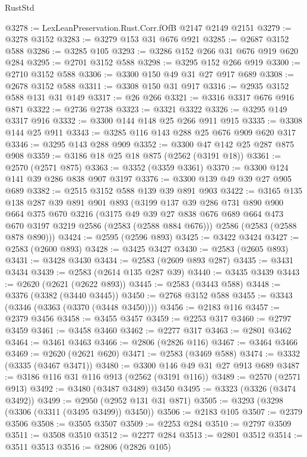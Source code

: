 \begin{lexlean}{RustStd}
\begin{coremodule}
{\begin{coremodule}
{{{{{{{{{{{{{{{@3278 := LexLeanPreservation.Rust.Corr.fOfB @2147 @2149 @2151
@3279 := @3278 @3152
@3283 := @3279 @153 @31 @676 @921
@3285 := @2687 @3152 @588
@3286 := @3285 @105
@3293 := @3286 @152 @266 @31 @676 @919 @620 @284
@3295 := @2701 @3152 @588
@3298 := @3295 @152 @266 @919
@3300 := @2710 @3152 @588
@3306 := @3300 @150 @49 @31 @27 @917 @689
@3308 := @2678 @3152 @588
@3311 := @3308 @150 @31 @917
@3316 := @2935 @3152 @588 @131 @31 @149
@3317 := @26 @266
@3321 := @3316 @3317 @676 @916 @871
@3322 := @2736 @2738
@3323 := @3321 @3322
@3326 := @3295 @149 @3317 @916
@3332 := @3300 @144 @148 @25 @266 @911 @915
@3335 := @3308 @144 @25 @911
@3343 := @3285 @116 @143 @288 @25 @676 @909 @620 @317
@3346 := @3295 @143 @288 @909
@3352 := @3300 @47 @142 @25 @287 @875 @908
@3359 := @3186 @18 @25 @18 @875 (@2562 (@3191 @18))
@3361 := @2570 (@2571 @875)
@3363 := @3352 (@3359 @3361)
@3370 := @3300 @124 @141 @39 @286 @838 @907 @3197
@3376 := @3300 @139 @49 @39 @27 @905 @689
@3382 := @2515 @3152 @588 @139 @39 @891 @903
@3422 := @3165
    @135
    @138
    @287
    @39
    @891
    @901
    @893
    (@3199
      @137
      @39
      @286
      @731
      @890
      @900
      @664
      @375
      @670
      @3216
      (@3175 @49 @39 @27 @838 @676 @689 @664 @473 @670 @3197 @3219 @2586 (@2583 (@2588 @884 @676)))
      @2586
      (@2583 (@2588 @878 @890)))
@3424 := @2595 (@2596 @893)
@3425 := @3422 @3424
@3427 := @2583 (@2600 @893)
@3428 := @3425 @3427
@3430 := @2583 (@2605 @893)
@3431 := @3428 @3430
@3434 := @2583 (@2609 @893 @287)
@3435 := @3431 @3434
@3439 := @2583 (@2614 @135 @287 @39)
@3440 := @3435 @3439
@3443 := @2620 (@2621 (@2622 @893))
@3445 := @2583 (@3443 @588)
@3448 := @3376 (@3382 (@3440 @3445))
@3450 := @2768 @3152 @588
@3455 := @3343 (@3346 (@3363 (@3370 (@3448 @3450))))
@3456 := @2183 @116
@3457 := @2379 @3456
@3458 := @3455 @3457
@3459 := @2253 @317
@3460 := @2797 @3459
@3461 := @3458 @3460
@3462 := @2277 @317
@3463 := @2801 @3462
@3464 := @3461 @3463
@3466 := @2806 (@2826 @116)
@3467 := @3464 @3466
@3469 := @2620 (@2621 @620)
@3471 := @2583 (@3469 @588)
@3474 := @3332 (@3335 (@3467 @3471))
@3480 := @3300 @146 @49 @31 @27 @913 @689
@3487 := @3186 @116 @31 @116 @913 (@2562 (@3191 @116))
@3489 := @2570 (@2571 @913)
@3492 := @3480 (@3487 @3489) @3450
@3495 := @3323 (@3326 (@3474 @3492))
@3499 := @2950 (@2952 @131 @31 @871)
@3505 := @3293 (@3298 (@3306 (@3311 (@3495 @3499)) @3450))
@3506 := @2183 @105
@3507 := @2379 @3506
@3508 := @3505 @3507
@3509 := @2253 @284
@3510 := @2797 @3509
@3511 := @3508 @3510
@3512 := @2277 @284
@3513 := @2801 @3512
@3514 := @3511 @3513
@3516 := @2806 (@2826 @105)
}}}}}}}}}}}}}}}
\end{coremodule}}
\end{coremodule}
\end{lexlean}
